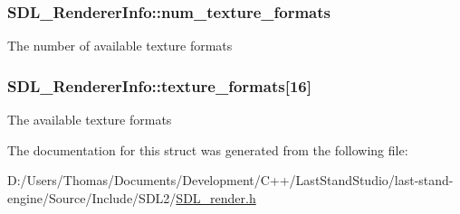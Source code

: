 \subsubsection[{num\+\_\+texture\+\_\+formats}]{ S\+D\+L\+\_\+\+Renderer\+Info\+::num\+\_\+texture\+\_\+formats}\label{structSDL__RendererInfo_acdec165b2053b914313f5996983ec6b8}
The number of available texture formats \hypertarget{structSDL__RendererInfo_a88450f9d48e593ec4571e3ba7cc3427d}{}
\subsubsection[{texture\+\_\+formats}]{ S\+D\+L\+\_\+\+Renderer\+Info\+::texture\+\_\+formats\mbox{[}16\mbox{]}}\label{structSDL__RendererInfo_a88450f9d48e593ec4571e3ba7cc3427d}
The available texture formats 

The documentation for this struct was generated from the following file\+:\begin{DoxyCompactItemize}
\item 
D\+:/\+Users/\+Thomas/\+Documents/\+Development/\+C++/\+Last\+Stand\+Studio/last-\/stand-\/engine/\+Source/\+Include/\+S\+D\+L2/\hyperlink{SDL__render_8h}{S\+D\+L\+\_\+render.\+h}\end{DoxyCompactItemize}
